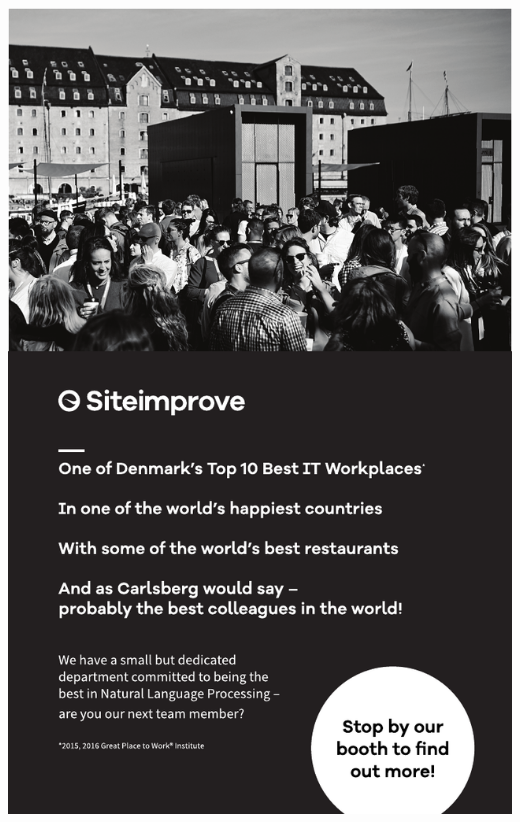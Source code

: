 \thispagestyle{empty}
\begin{center}
  \vfill
  \includegraphics[width=\textwidth]{content/ads/platinum/siteimprove.pdf}
  \vfill
\end{center}
\clearpage

